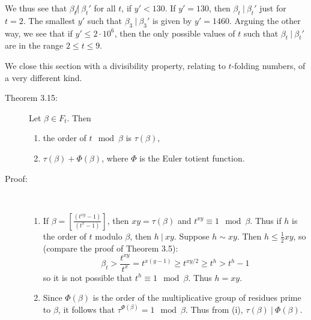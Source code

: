 \begin{description}
\begin{enumerate}[\hspace{1cm}(1)]
        We thus see that $\beta_{t} \not|\ \beta_{t}'$ for all $t$, if $y' < 130$. If $y' = 130$, then $\beta_{t}\ |\ \beta_{t}'$ just for $t = 2$. The smallest $y'$ such that $\beta_{3}\ |\ \beta_{3}'$ is given by $y' = 1460$. Arguing the other way, we see that if $y' \leq 2 \cdot 10^{6}$, then the only possible values of $t$ such that $\beta_{t}\ |\ \beta_{t}'$ are in the range $2 \leq t \leq 9$.
    \end{enumerate}

\end{description}

We close this section with a divisibility property, relating to $t$-folding numbers, of a very different kind.

\begin{description}

  \item[Theorem 3.15:] Let $\beta \in F_{t}$. Then
    \begin{enumerate}[\hspace{1cm}(i)]
      \item the order of $t \mod{\beta}$ is $\tau(\beta)$,
      \item $\tau(\beta) + \Phi(\beta)$, where $\Phi$ is the Euler totient function.
    \end{enumerate}

  \item[Proof:] $\ $
    \begin{enumerate}[\hspace{1cm}(i)]
      \item If $\beta = \left[ \frac{(t^{xy}-1)}{(t^{x}-1)} \right]$, then $xy = \tau(\beta)$ and $t^{xy} \equiv 1 \mod{\beta}$. Thus if $h$ is the order of $t$ modulo $\beta$, then $h\ |\ xy$. Suppose $h \sim xy$. Then $h \leq \frac{1}{2} xy$, so (compare the proof of Theorem 3.5):
        \begin{equation*}
        \beta_{t} > \frac{t^{xy}}{t^{x}} = t^{x(y-1)} \geq t^{xy/2} \geq t^{h} > t^{h}-1
        \end{equation*}
        so it is not possible that $t^{h} \equiv 1 \mod{\beta}$. Thus $h = xy$.
      \item Since $\Phi(\beta)$ is the order of the multiplicative group of residues prime to $\beta$, it follows that $\tau^{\Phi(\beta)} = 1 \mod{\beta}$. Thus from (i), $\tau(\beta)\ |\ \Phi(\beta)$.
    \end{enumerate}

\end{description}

